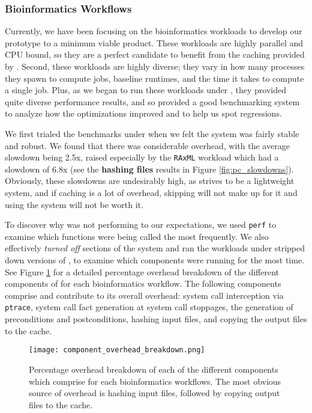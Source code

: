 \subsubsection{Bioinformatics Workflows}
Currently, we have been focusing on the bioinformatics workloads to develop our \pc prototype to a minimum viable product. These workloads are highly parallel and CPU bound, so they are a perfect candidate to benefit from the caching provided by \pc. Second, these workloads are highly diverse; they vary in how many processes they spawn to compute jobs, baseline runtimes, and the time it takes to compute a single job. Plus, as we began to run these workloads under \pc, they provided quite diverse performance results, and so provided a good benchmarking system to analyze how the optimizations improved \pc and to help us spot regressions.

We first trialed the benchmarks under \pc when we felt the system was fairly stable and robust. We found that there was considerable overhead, with the average slowdown being 2.5x, raised especially by the \texttt{RAxML} workload which had a slowdown of 6.8x (see the \textbf{hashing files} results in Figure \ref{fig:pc_slowdowns}). Obviously, these slowdowns are undesirably high, as \pc strives to be a lightweight system, and if caching is a lot of overhead, skipping will not make up for it and using the system will not be worth it.

To discover why \pc was not performing to our expectations, we used \texttt{perf} \cite{perf} to examine which functions were being called the most frequently. We also effectively \textit{turned off} sections of the system and ran the workloads under stripped down versions of \pc, to examine which components were running for the most time. See Figure \ref{fig:component_overhead_breakdown} for a detailed percentage overhead breakdown of the different components of \pc for each bioinformatics workflow. The following components comprise \pc and contribute to its overall overhead: system call interception via \texttt{ptrace}, system call fact generation at system call stoppages, the generation of preconditions and postconditions, hashing input files, and copying the output files to the cache. 

\begin{figure}[ht]
\centering
\texttt{[image: component\_overhead\_breakdown.png]}
\caption{\label{fig:component_overhead_breakdown} Percentage overhead breakdown of each of the different components which comprise \pc for each  bioinformatics workflows. The most obvious source of overhead is hashing input files, followed by copying output files to the cache.}
\end{figure}

